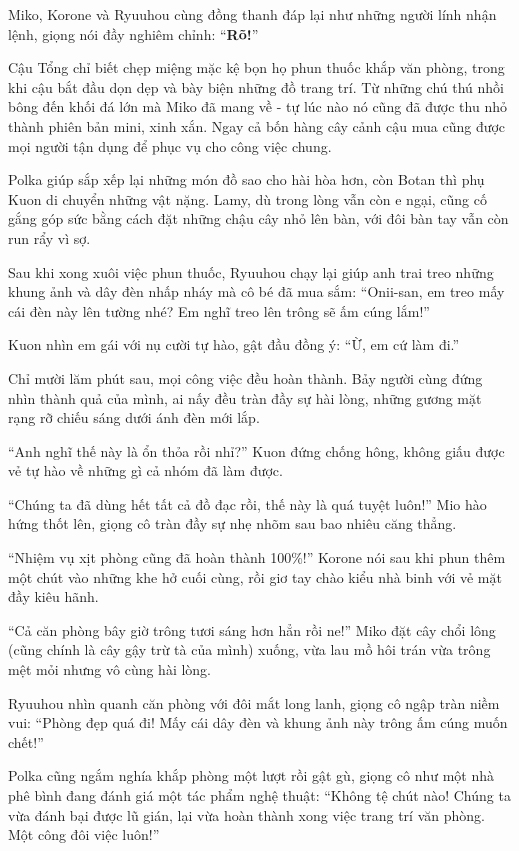 \documentclass[../main.tex]{subfiles}
\begin{document}
Miko, Korone và Ryuuhou cùng đồng thanh đáp lại như những người lính nhận lệnh, giọng nói đầy nghiêm chỉnh: ``\textbf{Rõ!}''

Cậu Tổng chỉ biết chẹp miệng mặc kệ bọn họ phun thuốc khắp văn phòng, trong khi cậu bắt đầu dọn dẹp và bày biện những đồ trang trí. Từ những chú thú nhồi bông đến khối đá lớn mà Miko đã mang về - tự lúc nào nó cũng đã được thu nhỏ thành phiên bản mini, xinh xắn. Ngay cả bốn hàng cây cảnh cậu mua cũng được mọi người tận dụng để phục vụ cho công việc chung.

Polka giúp sắp xếp lại những món đồ sao cho hài hòa hơn, còn Botan thì phụ Kuon di chuyển những vật nặng. Lamy, dù trong lòng vẫn còn e ngại, cũng cố gắng góp sức bằng cách đặt những chậu cây nhỏ lên bàn, với đôi bàn tay vẫn còn run rẩy vì sợ.

Sau khi xong xuôi việc phun thuốc, Ryuuhou chạy lại giúp anh trai treo những khung ảnh và dây đèn nhấp nháy mà cô bé đã mua sắm: ``Onii-san, em treo mấy cái đèn này lên tường nhé? Em nghĩ treo lên trông sẽ ấm cúng lắm!''

Kuon nhìn em gái với nụ cười tự hào, gật đầu đồng ý: ``Ừ, em cứ làm đi.''

\ct

Chỉ mười lăm phút sau, mọi công việc đều hoàn thành. Bảy người cùng đứng nhìn thành quả của mình, ai nấy đều tràn đầy sự hài lòng, những gương mặt rạng rỡ chiếu sáng dưới ánh đèn mới lắp.

``Anh nghĩ thế này là ổn thỏa rồi nhỉ?'' Kuon đứng chống hông, không giấu được vẻ tự hào về những gì cả nhóm đã làm được.

``Chúng ta đã dùng hết tất cả đồ đạc rồi, thế này là quá tuyệt luôn!'' Mio hào hứng thốt lên, giọng cô tràn đầy sự nhẹ nhõm sau bao nhiêu căng thẳng.

``Nhiệm vụ xịt phòng cũng đã hoàn thành 100\%!'' Korone nói sau khi phun thêm một chút vào những khe hở cuối cùng, rồi giơ tay chào kiểu nhà binh với vẻ mặt đầy kiêu hãnh.

``Cả căn phòng bây giờ trông tươi sáng hơn hẳn rồi ne!'' Miko đặt cây chổi lông (cũng chính là cây gậy trừ tà của mình) xuống, vừa lau mồ hôi trán vừa trông mệt mỏi nhưng vô cùng hài lòng.

Ryuuhou nhìn quanh căn phòng với đôi mắt long lanh, giọng cô ngập tràn niềm vui: ``Phòng đẹp quá đi! Mấy cái dây đèn và khung ảnh này trông ấm cúng muốn chết!''

Polka cũng ngắm nghía khắp phòng một lượt rồi gật gù, giọng cô như một nhà phê bình đang đánh giá một tác phẩm nghệ thuật: ``Không tệ chút nào! Chúng ta vừa đánh bại được lũ gián, lại vừa hoàn thành xong việc trang trí văn phòng. Một công đôi việc luôn!''
\end{document}

